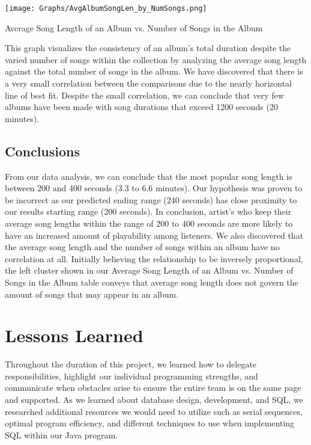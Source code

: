 \documentclass[12pt]{article}
\begin{document}
    \begin{center}
            \texttt{[image: Graphs/AvgAlbumSongLen\_by\_NumSongs.png]}
            \caption{Average Song Length of an Album vs. Number of Songs in the Album}
            \label{fig:Graph 3}
    \end{center}



    \vspace{0.5cm}

    \noindent This graph visualizes the consistency of an album's total duration
    despite the varied number of songs within the collection by analyzing the average
    song length against the total number of songs in the album. We have discovered
    that there is a very small correlation between the comparisons due to the nearly
    horizontal line of best fit. Despite the small correlation, we can conclude that
    very few albums have been made with song durations that exceed 1200 seconds
    (20 minutes).


    \subsection{Conclusions}
    From our data analysis, we can conclude that the most popular song length is
    between 200 and 400 seconds (3.3 to 6.6 minutes). Our hypothesis was proven to
    be incorrect as our predicted ending range (240 seconds) has close proximity to
    our results starting range (200 seconds). In conclusion, artist's who keep their
    average song lengths within the range of 200 to 400 seconds are more likely to have
    an increased amount of playability among listeners. We also discovered that the
    average song length and the number of songs within an album have no correlation
    at all. Initially believing the relationship to be inversely proportional, the
    left cluster shown in our Average Song Length of an Album vs. Number of Songs
    in the Album table conveys that average song length does not govern the
    amount of songs that may appear in an album.

    \section{Lessons Learned}
    Throughout the duration of this project, we learned how to delegate responsibilities,
    highlight our individual programming strengths, and communicate when obstacles arise
    to ensure the entire team is on the same page and supported. As we
    learned about database design, development, and SQL, we researched additional resources
    we would need to utilize such as serial sequences, optimal program efficiency, and different
    techniques to use when implementing SQL within our Java program.
\end{document}
